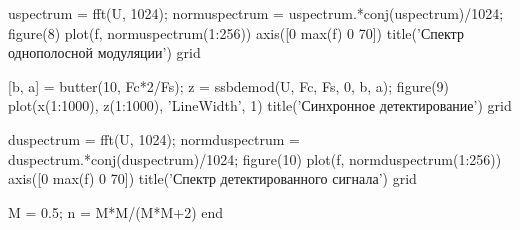 \documentclass[10pt,a4paper]{report}
\begin{document}
uspectrum = fft(U, 1024);\newline
normuspectrum = uspectrum.*conj(uspectrum)/1024;\newline
figure(8)\newline
plot(f, normuspectrum(1:256))\newline
axis([0 max(f) 0 70])\newline
title('Спектр однополосной модуляции')\newline
grid\newline

[b, a] = butter(10, Fc*2/Fs);\newline
z = ssbdemod(U, Fc, Fs, 0, b, a);\newline
figure(9)\newline
plot(x(1:1000), z(1:1000), 'LineWidth', 1)\newline
title('Синхронное детектирование')\newline
grid\newline

duspectrum = fft(U, 1024);\newline
normduspectrum = duspectrum.*conj(duspectrum)/1024;\newline
figure(10)\newline
plot(f, normduspectrum(1:256))\newline
axis([0 max(f) 0 70])\newline
title('Спектр детектированного сигнала')\newline
grid\newline

M = 0.5;\newline
n = M*M/(M*M+2)\newline
end
\end{document}
